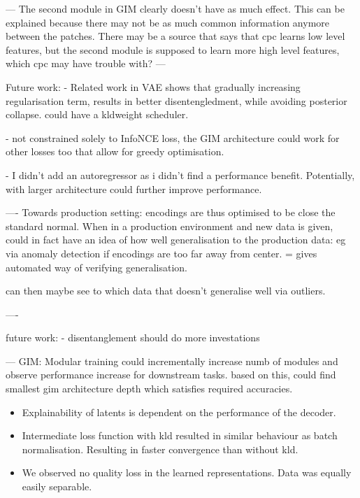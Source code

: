 \documentclass[]{book}
\begin{document}
---
The second module in GIM clearly doesn't have as much effect. This can be explained because there may not be as much common information anymore between the patches. There may be a source that says that cpc learns low level features, but the second module is supposed to learn more high level features, which cpc may have trouble with?
---

Future work:
 - Related work in VAE shows that gradually increasing regularisation term, results in better disentengledment, while avoiding posterior collapse. could have a kldweight scheduler.
 
- not constrained solely to InfoNCE loss, the GIM architecture could work for other losses too that allow for greedy optimisation.


- I didn't add an autoregressor as i didn't find a performance benefit. Potentially, with larger architecture could further improve performance.



----
Towards production setting:
	encodings are thus optimised to be close the standard normal. When in a production environment and new data is given, could in fact have an idea of how well generalisation to the production data: eg via anomaly detection if encodings are too far away from center. 
	= gives automated way of verifying generalisation.
	
	can then maybe see to which data that doesn't generalise well via outliers.
	
----


future work:
- disentanglement should do more investations


---
GIM: Modular training
could incrementally increase numb of modules and observe performance increase for downstream tasks.
based on this, could find smallest gim architecture depth which satisfies required accuracies.



\begin{itemize}
	\item Explainability of latents is dependent on the performance of the decoder.
	\item Intermediate loss function with kld resulted in similar behaviour as batch normalisation. Resulting in faster convergence than without kld.
	\item We observed no quality loss in the learned representations. Data was equally easily separable.
\end{itemize}








\end{document}
